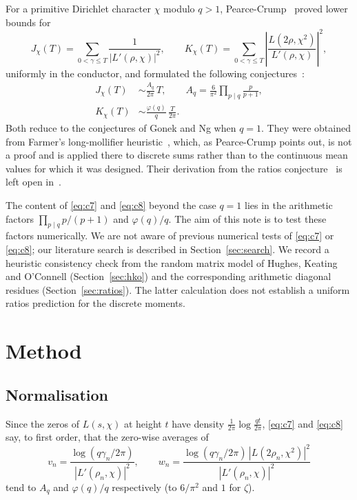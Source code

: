 \documentclass[11pt]{amsart}
\newcommand{\Lp}{L'}
\begin{document}
For a primitive Dirichlet character $\chi$ modulo $q>1$, Pearce-Crump~\cite{PC} proved lower bounds for
\[
J_\chi(T)=\sum_{0<\gamma\le T}\frac{1}{|\Lp(\rho,\chi)|^{2}},\qquad
K_\chi(T)=\sum_{0<\gamma\le T}\left|\frac{L(2\rho,\chi^{2})}{\Lp(\rho,\chi)}\right|^{2},
\]
uniformly in the conductor, and formulated the following conjectures~\cite[Conjectures~7 and~8]{PC}:
\begin{align}
J_\chi(T)&\sim\frac{A_q}{2\pi}\,T,\qquad A_q=\frac{6}{\pi^{2}}\prod_{p\mid q}\frac{p}{p+1},\label{eq:c7}\\
K_\chi(T)&\sim\frac{\varphi(q)}{q}\,\frac{T}{2\pi}.\label{eq:c8}
\end{align}
Both reduce to the conjectures of Gonek and Ng when $q=1$. They were obtained from Farmer's long-mollifier
heuristic~\cite{Farmer}, which, as Pearce-Crump points out, is not a proof and is applied there to discrete sums
rather than to the continuous mean values for which it was designed. Their derivation from the ratios
conjecture~\cite{CFZ,CS} is left open in~\cite{PC}.

The content of \eqref{eq:c7} and \eqref{eq:c8} beyond the case $q=1$ lies in the arithmetic factors
$\prod_{p\mid q}p/(p+1)$ and $\varphi(q)/q$. The aim of this note is to test these factors numerically. We are not aware
of previous numerical tests of \eqref{eq:c7} or \eqref{eq:c8}; our literature search is described in
Section~\ref{sec:search}. We record a heuristic consistency check from the random matrix model of Hughes, Keating and
O'Connell (Section~\ref{sec:hko}) and the corresponding arithmetic diagonal residues (Section~\ref{sec:ratios}).
The latter calculation does not establish a uniform ratios prediction for the discrete moments.

\section{Method}

\subsection{Normalisation}
Since the zeros of $L(s,\chi)$ at height $t$ have density $\frac{1}{2\pi}\log\frac{qt}{2\pi}$, \eqref{eq:c7} and
\eqref{eq:c8} say, to first order, that the zero-wise averages of
\[
v_n=\frac{\log(q\gamma_n/2\pi)}{|\Lp(\rho_n,\chi)|^{2}},\qquad
w_n=\frac{\log(q\gamma_n/2\pi)\,|L(2\rho_n,\chi^{2})|^{2}}{|\Lp(\rho_n,\chi)|^{2}}
\]
tend to $A_q$ and $\varphi(q)/q$ respectively (to $6/\pi^2$ and $1$ for $\zeta$).
\end{document}
